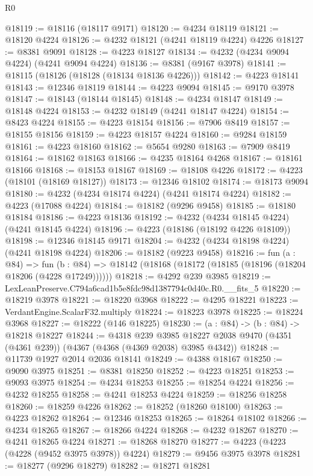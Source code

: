 \begin{lexlean}{R0}
\begin{coremodule}
@18119 := @18116 (@18117 @9171)
@18120 := @4234 @18119
@18121 := @18120 @4224
@18126 := @4232 @18121 (@4241 @18119 @4224) @4226
@18127 := @8381 @9091
@18128 := @4223 @18127
@18134 := @4232 (@4234 @9094 @4224) (@4241 @9094 @4224)
@18136 := @8381 (@9167 @3978)
@18141 := @18115 (@18126 (@18128 (@18134 @18136 @4226)))
@18142 := @4223 @18141
@18143 := @12346 @18119
@18144 := @4223 @9094
@18145 := @9170 @3978
@18147 := @18143 (@18144 @18145)
@18148 := @4234 @18147
@18149 := @18148 @4224
@18153 := @4232 @18149 (@4241 @18147 @4224)
@18154 := @8423 @4224
@18155 := @4223 @18154
@18156 := @7906 @8419
@18157 := @18155 @18156
@18159 := @4223 @18157 @4224
@18160 := @9284 @18159
@18161 := @4223 @18160
@18162 := @5654 @9280
@18163 := @7909 @8419
@18164 := @18162 @18163
@18166 := @4235 @18164 @4268
@18167 := @18161 @18166
@18168 := @18153 @18167
@18169 := @18108 @4226
@18172 := @4223 (@18101 (@18169 @18127))
@18173 := @12346 @18102
@18174 := @18173 @9094
@18180 := @4232 (@4234 @18174 @4224) (@4241 @18174 @4224)
@18182 := @4223 (@17088 @4224)
@18184 := @18182 (@9296 @9458)
@18185 := @18180 @18184
@18186 := @4223 @18136
@18192 := @4232 (@4234 @18145 @4224) (@4241 @18145 @4224)
@18196 := @4223 (@18186 (@18192 @4226 @18109))
@18198 := @12346 @18145 @9171
@18204 := @4232 (@4234 @18198 @4224) (@4241 @18198 @4224)
@18206 := @18182 (@9223 @9458)
@18216 := fun (a : @84) =>
  fun (b : @84) => @18142 (@18168 (@18172 (@18185 (@18196 (@18204 @18206 (@4228 @17249))))))
@18218 := @4292 @239 @3985
@18219 := LexLeanPreserve.C794a6cad1b5e8fdc98d1387794c0d40c.R0.__fits_5
@18220 := @18219 @3978
@18221 := @18220 @3968
@18222 := @4295 @18221
@18223 := VerdantEngine.ScalarF32.multiply
@18224 := @18223 @3978
@18225 := @18224 @3968
@18227 := @18222 (@146 @18225)
@18230 := (a : @84) -> (b : @84) -> @18218 @18227
@18244 := @4318
    @239
    @3985
    @18227
    @2038
    @9470
    (@4351 (@4361 @239))
    (@4367 (@4368 (@4369 @2038) @3985 @4342))
@18248 := @11739 @1927 @2014 @2036 @18141
@18249 := @4388 @18167
@18250 := @9090 @3975
@18251 := @8381 @18250
@18252 := @4223 @18251
@18253 := @9093 @3975
@18254 := @4234 @18253
@18255 := @18254 @4224
@18256 := @4232 @18255
@18258 := @4241 @18253 @4224
@18259 := @18256 @18258
@18260 := @18259 @4226
@18262 := @18252 (@18260 @18100)
@18263 := @4223 @18262
@18264 := @12346 @18253
@18265 := @18264 @18102
@18266 := @4234 @18265
@18267 := @18266 @4224
@18268 := @4232 @18267
@18270 := @4241 @18265 @4224
@18271 := @18268 @18270
@18277 := @4223 (@4223 (@4228 (@9452 @3975 @3978)) @4224)
@18279 := @9456 @3975 @3978
@18281 := @18277 (@9296 @18279)
@18282 := @18271 @18281

\end{coremodule}
\end{lexlean}
